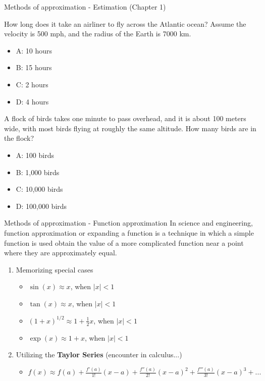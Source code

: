 \documentclass{beamer}
\begin{document}
\begin{frame}{Methods of approximation - Estimation (Chapter 1)}
\small
\begin{minipage}[b]{0.45\linewidth}
How long does it take an airliner to fly across the Atlantic ocean?  Assume the velocity is 500 mph, and the radius of the Earth is 7000 km.
\vspace{0.6cm}
\begin{itemize}
\item A: 10 hours
\item B: 15 hours
\item C: 2 hours
\item D: 4 hours
\end{itemize}
\end{minipage}
\hspace{0.5cm}
\begin{minipage}[b]{0.45\linewidth}
A flock of birds takes one minute to pass overhead, and it is about 100 meters wide, with most birds flying at roughly the same altitude.  How many birds are in the flock?
\vspace{0.1cm}
\begin{itemize}
\item A: 100 birds
\item B: 1,000 birds
\item C: 10,000 birds
\item D: 100,000 birds
\end{itemize}
\end{minipage}
\end{frame}

\begin{frame}{Methods of approximation - Function approximation}
In science and engineering, \alert{function approximation} or \alert{expanding a function} is a technique in which a simple function is used obtain the value of a more complicated function near a point where they are approximately equal. 
\begin{enumerate}
\item Memorizing \alert{special cases}
\begin{itemize}
\item $\sin(x) \approx x$, when $|x| < 1$
\item $\tan(x) \approx x$, when $|x| < 1$
\item $(1+x)^{1/2} \approx 1+ \frac{1}{2}x$, when $|x| < 1$
\item $\exp(x) \approx 1 + x$, when $|x| < 1$
\end{itemize}
\item Utilizing the \textbf{Taylor Series} (encounter in calculus...)
\begin{itemize}
\item $f(x) \approx f(a) + \frac{f'(a)}{1!}(x-a) + \frac{f''(a)}{2!}(x-a)^2 + \frac{f'''(a)}{3!}(x-a)^3 + ...$
\end{itemize}
\end{enumerate}
\end{frame}
\end{document}
